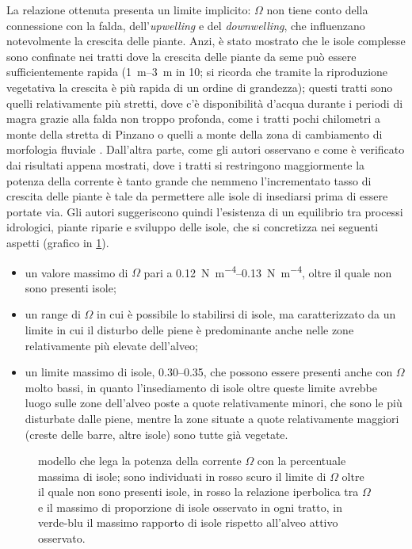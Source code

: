 La relazione ottenuta presenta un limite implicito: $\Omega$ non tiene conto della connessione con la falda, dell'\emph{upwelling} e del \emph{downwelling}, che influenzano notevolmente la crescita delle piante.
Anzi, è stato mostrato che le isole complesse sono confinate nei tratti dove la crescita delle piante da seme può essere sufficientemente rapida (\SIrange[range-phrase={-}, range-units = single]{1}{3}{\m} in \SI{10}{\anni}; si ricorda che tramite la riproduzione vegetativa la crescita è più rapida di un ordine di grandezza); questi tratti sono quelli relativamente più stretti, dove c'è disponibilità d'acqua durante i periodi di magra grazie alla falda non troppo profonda, come i tratti pochi chilometri a monte della stretta di Pinzano o quelli a monte della zona di cambiamento di morfologia fluviale .
Dall'altra parte, come gli autori osservano e come è verificato dai risultati appena mostrati, dove i tratti si restringono maggiormente la potenza della corrente è tanto grande che nemmeno l'incrementato tasso di crescita delle piante è tale da permettere alle isole di insediarsi prima di essere portate via.
Gli autori suggeriscono quindi l'esistenza di un equilibrio tra processi idrologici, piante riparie e sviluppo delle isole, che si concretizza nei seguenti aspetti (grafico in \cref{graph:omega-area-percentuale-linear-modello}).
%
\begin{itemize}
	\item un valore massimo di $\Omega$ pari a \SIrange[range-phrase={-}]{0.12}{0.13}{\newton\per\metre\tothe{4}}, oltre il quale non sono presenti isole;
	\item un range di $\Omega$ in cui è possibile lo stabilirsi di isole, ma caratterizzato da un limite in cui il disturbo delle piene è predominante anche nelle zone relativamente più elevate dell'alveo;
	\item un limite massimo di isole, \numrange[range-phrase={-}]{0.30}{0.35}, che possono essere presenti anche con $\Omega$ molto bassi, in quanto l'insediamento di isole oltre queste limite avrebbe luogo sulle zone dell'alveo poste a quote relativamente minori, che sono le più disturbate dalle piene, mentre la zone situate a quote relativamente maggiori (creste delle barre, altre isole) sono tutte già vegetate.
\end{itemize}
%
%
\begin{figure}
	\centering
	
	\caption[modello che lega la potenza della corrente con la percentuale massima di isole]{modello che lega la potenza della corrente $\Omega$ con la percentuale massima di isole; sono individuati in rosso scuro il limite di $\Omega$ oltre il quale non sono presenti isole, in rosso la relazione iperbolica tra $\Omega$ e il massimo di proporzione di isole osservato in ogni tratto, in verde-blu il massimo rapporto di isole rispetto all'alveo attivo osservato.}
	\label{graph:omega-area-percentuale-linear-modello}
\end{figure}
%
